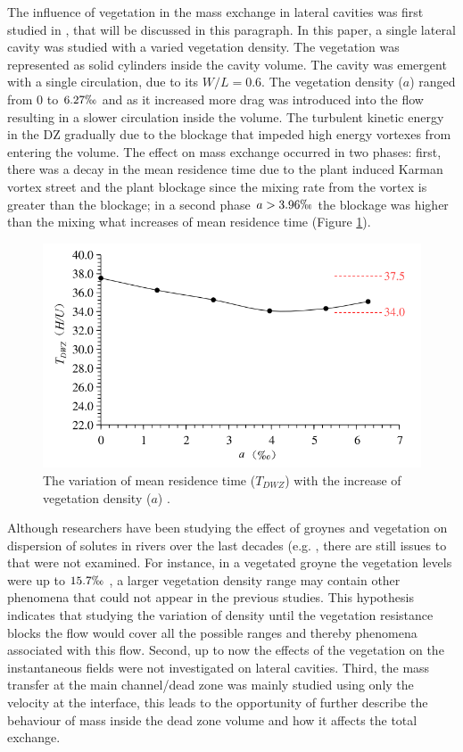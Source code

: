The influence of vegetation in the mass exchange in lateral cavities was first studied in \textcite{xiang2019}, that will be discussed in this paragraph. In this paper, a single lateral cavity was studied with a varied vegetation density. The vegetation was represented as solid cylinders inside the cavity volume. The cavity was emergent with a single circulation, due to its $W/L=0.6$. The vegetation density ($a$) ranged from 0 to $6.27\permil$ and as it increased more drag was introduced into the flow resulting in a slower circulation inside the volume. The turbulent kinetic energy in the DZ gradually due to the blockage that impeded high energy vortexes from entering the volume. The effect on mass exchange occurred in two phases: first, there was a decay in the mean residence time due to the plant induced Karman vortex street and the plant blockage since the mixing rate from the vortex is greater than the blockage; in a second phase $a>3.96\permil$ the blockage was higher than the mixing what increases of mean residence time (Figure \ref{fig:xiang2019fig12}).
\begin{figure}[!ht]
\centering
\includegraphics[width=0.8\linewidth]{../images/introduction/xiang2019fig12.png}
\caption{The variation of mean residence time ($T_{DWZ}$) with the increase of vegetation density ($a$) \cite{xiang2019}.}
\label{fig:xiang2019fig12}
\end{figure}

Although researchers have been studying the effect of groynes and vegetation on dispersion of solutes in rivers over the last decades (e.g. \textcite{sukhodolov2017,xiang2019,xiang2020}, there are still issues to that were not examined. For instance, in a vegetated groyne the vegetation levels were up to $15.7\permil$ \cite{sukhodolov2017}, a larger vegetation density range may contain other phenomena that could not appear in the previous studies. This hypothesis indicates that studying the variation of density until the vegetation resistance blocks the flow would cover all the possible ranges and thereby phenomena associated with this flow. Second, up to now the effects of the vegetation on the instantaneous fields were not investigated on lateral cavities. Third, the mass transfer at the main channel/dead zone was mainly studied using only the velocity at the interface, this leads to the opportunity of further describe the behaviour of mass inside the dead zone volume and how it affects the total exchange.


